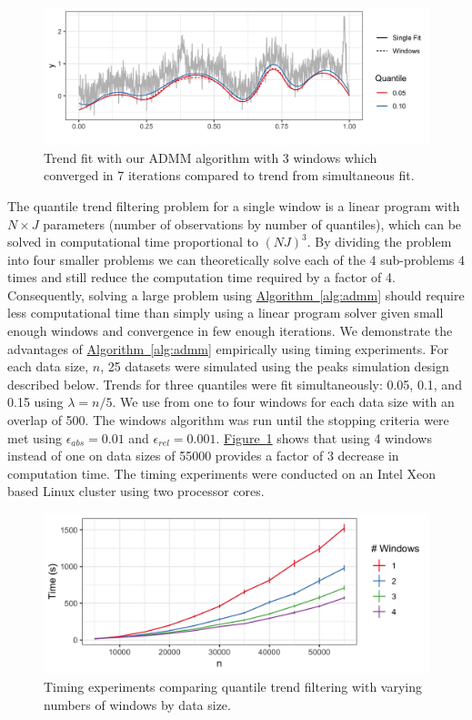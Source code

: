 \documentclass[aoas]{imsart}
\newcommand{\Fig}[1]{\hyperref[fig:#1]{Figure~\ref*{fig:#1}}} %
\newcommand{\Alg}[1]{\hyperref[alg:#1]{Algorithm~\ref*{alg:#1}}} %
\newcommand{\Fig}[1]{{Figure~\ref{fig:#1}}} %
\newcommand{\Alg}[1]{{Algorithm~\ref{alg:#1}}} %
\begin{document}
\begin{figure}
	\centering
	\includegraphics[width = 0.8\linewidth]{Figures/admm_windows.png}
	\caption{Trend fit with our ADMM algorithm with 3 windows which converged in 7 iterations compared to trend from simultaneous fit.}
\end{figure}

The quantile trend filtering problem for a single window is a linear program with $N\times J$ parameters (number of observations by number of quantiles), which can be solved in computational time proportional to $(NJ)^3$. By dividing the problem into four smaller problems we can theoretically solve each of the 4 sub-problems 4 times and still reduce the computation time required by a factor of 4. Consequently, solving a large problem using \Alg{admm} should require less computational time than simply using a linear program solver given small enough windows and convergence in few enough iterations. We demonstrate the advantages of \Alg{admm} empirically using timing experiments. For each data size, $n$, 25 datasets were simulated using the peaks simulation design described below. Trends for three quantiles were fit simultaneously: 0.05, 0.1, and 0.15 using $\lambda = n/5$. We use from one to four windows for each data size with an overlap of 500. The windows algorithm was run until the stopping criteria were met using $\epsilon_{abs} = 0.01$ and $\epsilon_{rel} = 0.001$. \Fig{timing} shows that using 4 windows instead of one on data sizes of 55000 provides a factor of 3 decrease in computation time. The timing experiments were conducted on an Intel Xeon based Linux cluster using two processor cores.


\begin{figure}[!t]
	\centering
	\includegraphics[width = 0.7\linewidth]{Figures/Fig_timing_experiment.png}
	\caption{Timing experiments comparing quantile trend filtering with varying numbers of windows by data size.}
	\label{fig:timing}
\end{figure}
\end{document}
